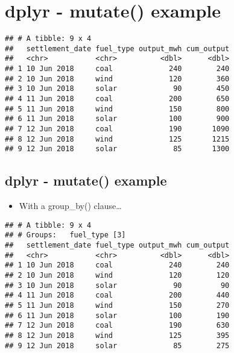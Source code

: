 \documentclass[]{article}
\newenvironment{Shaded}{\begin{snugshade}}{\end{snugshade}}
\newcommand{\KeywordTok}[1]{\textcolor[rgb]{0.13,0.29,0.53}{\textbf{#1}}}
\newcommand{\DataTypeTok}[1]{\textcolor[rgb]{0.13,0.29,0.53}{#1}}
\newcommand{\StringTok}[1]{\textcolor[rgb]{0.31,0.60,0.02}{#1}}
\newcommand{\OperatorTok}[1]{\textcolor[rgb]{0.81,0.36,0.00}{\textbf{#1}}}
\newcommand{\NormalTok}[1]{#1}
\providecommand{\tightlist}{%
  \setlength{\itemsep}{0pt}\setlength{\parskip}{0pt}}
\begin{document}
\section{dplyr - mutate() example}\label{dplyr---mutate-example}

\begin{Shaded}
\end{Shaded}

\begin{verbatim}
## # A tibble: 9 x 4
##   settlement_date fuel_type output_mwh cum_output
##   <chr>           <chr>          <dbl>      <dbl>
## 1 10 Jun 2018     coal             240        240
## 2 10 Jun 2018     wind             120        360
## 3 10 Jun 2018     solar             90        450
## 4 11 Jun 2018     coal             200        650
## 5 11 Jun 2018     wind             150        800
## 6 11 Jun 2018     solar            100        900
## 7 12 Jun 2018     coal             190       1090
## 8 12 Jun 2018     wind             125       1215
## 9 12 Jun 2018     solar             85       1300
\end{verbatim}

\subsection{dplyr - mutate() example}\label{dplyr---mutate-example-1}

\begin{itemize}
\tightlist
\item
  With a group\_by() clause\ldots{}
\end{itemize}

\begin{Shaded}
\end{Shaded}

\begin{verbatim}
## # A tibble: 9 x 4
## # Groups:   fuel_type [3]
##   settlement_date fuel_type output_mwh cum_output
##   <chr>           <chr>          <dbl>      <dbl>
## 1 10 Jun 2018     coal             240        240
## 2 10 Jun 2018     wind             120        120
## 3 10 Jun 2018     solar             90         90
## 4 11 Jun 2018     coal             200        440
## 5 11 Jun 2018     wind             150        270
## 6 11 Jun 2018     solar            100        190
## 7 12 Jun 2018     coal             190        630
## 8 12 Jun 2018     wind             125        395
## 9 12 Jun 2018     solar             85        275
\end{verbatim}
\end{document}
